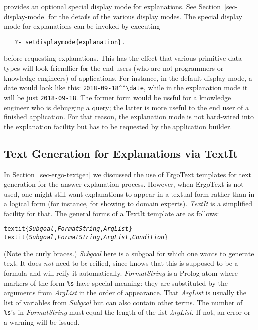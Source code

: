 \FLSYSTEM provides an optional special display mode for explanations.
See Section~\ref{sec-display-mode} for the details of the various display modes.
The special display mode for explanations can be invoked by executing
\begin{verbatim}
   ?- setdisplaymode{explanation}.
\end{verbatim}
before requesting explanations.
This has the effect that various primitive data types
will look friendlier for the end-users (who are not programmers or
knowledge engineers) of \FLSYSTEM applications. For instance, in the
default display mode, a date would look like this:
\verb|2018-09-18^^\date|, while in the explanation mode it will be just
\texttt{2018-09-18}. The former form would be useful for a knowledge
engineer who is debugging a query; the latter is more useful to the 
end user of a finished application.
For that reason, the explanation mode is not hard-wired into the
explanation facility but has to be requested by the application builder.



\subsection{Text Generation for Explanations via TextIt}\label{sec-textit}

In Section~\ref{sec-ergo-textgen} we discussed the use of ErgoText
templates for text generation for the answer explanation process.
However, when ErgoText is not used, one might still want explanations
to appear in a textual form rather than in a logical form (for
instance, for showing to domain experts). \emph{TextIt} is a simplified facility for
that. The general forms of a TextIt template are as follows:
\begin{alltt}
   textit\{\textnormal{\emph{Subgoal},\emph{FormatString},\emph{ArgList}}\}
   textit\{\textnormal{\emph{Subgoal},\emph{FormatString},\emph{ArgList},\emph{Condition}}\}
\end{alltt}
(Note the curly braces.)
\emph{Subgoal} here is a subgoal for which one wants to generate text. It
does \emph{not} need to be reified, since \ERGO knows that this is supposed  
to be a formula and will reify it automatically. \emph{FormatString} is a
Prolog atom where markers of the form \texttt{\%s} have special meaning:
they are substituted by the arguments from \emph{ArgList} in the order of
appearance. That \emph{ArgList} is usually the list of variables from
\emph{Subgoal} but can also contain other terms.
The number of \texttt{\%s}'s in \emph{FormatString} must equal the length
of the list \emph{ArgList}. If not, an error or a warning will be issued.

